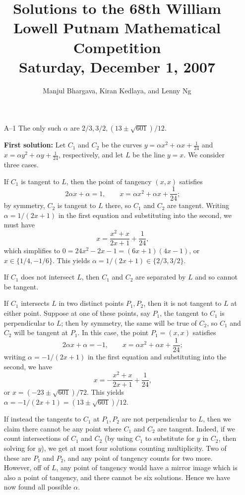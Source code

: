 \documentclass[amssymb,twocolumn,pra,10pt,aps]{revtex4-1}
\begin{document}
\title{Solutions to the 68th William Lowell Putnam Mathematical Competition \\
    Saturday, December 1, 2007}
\author{Manjul Bhargava, Kiran Kedlaya, and Lenny Ng}
\noaffiliation
\maketitle

\begin{itemize}

\item[A--1]
The only such $\alpha$ are $2/3, 3/2, (13 \pm \sqrt{601})/12$.

\textbf{First solution:}
Let $C_1$ and $C_2$ be the curves
$y=\alpha x^2 + \alpha x + \frac{1}{24}$
and $x=\alpha y^2 + \alpha y + \frac{1}{24}$, respectively,
and let $L$ be the line $y=x$.
We consider three cases.

If $C_1$ is tangent to $L$, then the point of tangency $(x,x)$ satisfies
\[
2\alpha x + \alpha = 1, \qquad x = \alpha x^2 + \alpha x + \frac{1}{24};
\]
by symmetry, $C_2$ is tangent to $L$ there, so $C_1$ and $C_2$ are tangent.
Writing $\alpha = 1/(2x+1)$ in the first equation and substituting into
the second, we must have
\[
x = \frac{x^2+x}{2x+1} + \frac{1}{24},
\]
which simplifies to $0 = 24x^2 - 2x - 1
= (6x+1)(4x-1)$, or $x \in \{1/4, -1/6\}$. This yields
$\alpha = 1/(2x+1) \in \{2/3, 3/2\}$.

If $C_1$ does not intersect $L$, then $C_1$ and $C_2$ are separated by $L$
and so cannot be tangent.

If $C_1$ intersects $L$ in two distinct points $P_1, P_2$, then it is not
tangent to $L$ at either point. Suppose at one of these points, say $P_1$,
the tangent to $C_1$ is perpendicular to $L$; then by symmetry, the same
will be true of $C_2$, so $C_1$ and $C_2$ will be tangent at $P_1$. In this
case, the point $P_1 = (x,x)$ satisfies
\[
2 \alpha x + \alpha = -1, \qquad x = \alpha x^2 + \alpha x + \frac{1}{24};
\]
writing $\alpha = -1/(2x+1)$ in the first equation and substituting into
the second, we have
\[
x = -\frac{x^2+x}{2x+1} + \frac{1}{24},
\]
or
$x = (-23 \pm \sqrt{601})/72$.
This yields
$\alpha = -1/(2x+1) = (13 \pm \sqrt{601})/12$.

If instead the tangents to $C_1$ at $P_1, P_2$ are not perpendicular to
$L$, then we claim there cannot be any point where $C_1$ and $C_2$ are tangent.
Indeed, if we count intersections of $C_1$ and $C_2$ (by using $C_1$ to
substitute for $y$ in $C_2$, then solving for $y$), we get at most four
solutions counting multiplicity. Two of these are $P_1$ and $P_2$,
and any point of tangency counts for two more. However, off of $L$,
any point of tangency would have a mirror image which is also a point of
tangency, and there cannot be six solutions. Hence we have now found all
possible $\alpha$.


\end{itemize}
\end{document}
